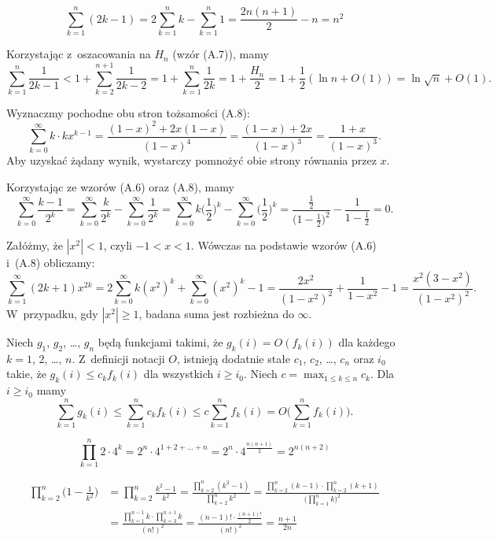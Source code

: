
\exercise %
\[
	\sum_{k=1}^n(2k-1) = 2\sum_{k=1}^nk-\sum_{k=1}^n1 = \frac{2n(n+1)}{2}-n = n^2
\]

\exercise %
Korzystając z~oszacowania na $H_n$ (wzór (A.7)), mamy
\[
    \sum_{k=1}^n\frac{1}{2k-1} < 1+\sum_{k=2}^{n+1}\frac{1}{2k-2} = 1+\sum_{k=1}^n\frac{1}{2k} = 1+\frac{H_n}{2} = 1+\frac{1}{2}(\ln n+O(1)) = \ln\sqrt{n}+O(1).
\]

\exercise %
Wyznaczmy pochodne obu stron tożsamości (A.8):
\[
	\sum_{k=0}^\infty k\cdot kx^{k-1} = \frac{(1-x)^2+2x(1-x)}{(1-x)^4} = \frac{(1-x)+2x}{(1-x)^3} = \frac{1+x}{(1-x)^3}.
\]
Aby uzyskać żądany wynik, wystarczy pomnożyć obie strony równania przez $x$.

\exercise %
Korzystając ze wzorów (A.6) oraz (A.8), mamy
\[
	\sum_{k=0}^\infty\frac{k-1}{2^k} = \sum_{k=0}^\infty\frac{k}{2^k}-\sum_{k=0}^\infty\frac{1}{2^k} = \sum_{k=0}^\infty k\biggl(\frac{1}{2}\biggr)^k-\sum_{k=0}^\infty\biggl(\frac{1}{2}\biggr)^k = \frac{\frac{1}{2}}{\bigl(1-\frac{1}{2}\bigr)^2}-\frac{1}{1-\frac{1}{2}} = 0.
\]

\exercise %
Załóżmy, że $|x^2|<1$, czyli $-1<x<1$.
Wówczas na podstawie wzorów (A.6) i~(A.8) obliczamy:
\[
	\sum_{k=1}^\infty(2k+1)x^{2k} = 2\sum_{k=0}^\infty k(x^2)^k+\sum_{k=0}^\infty(x^2)^k-1 = \frac{2x^2}{(1-x^2)^2}+\frac{1}{1-x^2}-1 = \frac{x^2(3-x^2)}{(1-x^2)^2}.
\]
W~przypadku, gdy $|x^2|\ge1$, badana suma jest rozbieżna do $\infty$.

\exercise %
Niech $g_1$, $g_2$, \dots, $g_n$ będą funkcjami takimi, że $g_k(i)=O(f_k(i))$ dla każdego $k=1$, 2, \dots, $n$.
Z~definicji notacji $O$, istnieją dodatnie stałe $c_1$, $c_2$, \dots, $c_n$ oraz $i_0$ takie, że $g_k(i)\le c_kf_k(i)$ dla wszystkich $i\ge i_0$.
Niech $c=\max_{1\le k\le n}c_k$.
Dla $i\ge i_0$ mamy
\[
	\sum_{k=1}^ng_k(i) \le \sum_{k=1}^nc_kf_k(i) \le c\sum_{k=1}^nf_k(i) = O\biggl(\sum_{k=1}^nf_k(i)\biggr).
\]

\exercise %
\[
	\prod_{k=1}^n2\cdot4^k = 2^n\cdot4^{1+2+\dots+n} = 2^n\cdot4^{\frac{n(n+1)}{2}} = 2^{n(n+2)}
\]

\exercise %
\begin{align*}
	\prod_{k=2}^n\biggl(1-\frac{1}{k^2}\biggr) &= \prod_{k=2}^n\frac{k^2-1}{k^2} = \frac{\prod_{k=2}^n(k^2-1)}{\prod_{k=2}^nk^2} = \frac{\prod_{k=2}^n(k-1)\cdot\prod_{k=2}^n(k+1)}{\bigl(\prod_{k=1}^nk\bigr)^2} \\[2mm]
	&= \frac{\prod_{k=1}^{n-1}k\cdot\prod_{k=3}^{n+1}k}{(n!)^2} = \frac{(n-1)!\cdot\frac{(n+1)!}{2}}{(n!)^2} = \frac{n+1}{2n}
\end{align*}
